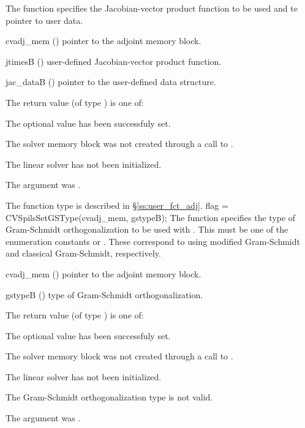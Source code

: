 {
  The function  specifies the Jacobian-vector 
  product function to be used and te pointer to user data.
}
{
  \begin{args}
  \item[cvadj\_mem] ()
    pointer to the adjoint memory block.
  \item[jtimesB] ()
    user-defined Jacobian-vector product function.
  \item[jac\_dataB] ()
    pointer to the user-defined data structure.
  \end{args}
}
{
  The return value  (of type ) is one of:
  \begin{args}
  \item[\Id{CVSPILS\_SUCCESS}] 
    The optional value has been successfuly set.
  \item[\Id{CVSPILS\_MEM\_NULL}]
    The {\cvodes} solver memory block was not created through a call to .
  \item[\Id{CVSPILS\_LMEM\_NULL}]
    The {\cvspgmr} linear solver has not been initialized.
  \item[\Id{CVSPILS\_ADJMEM\_NULL}]
    The  argument was .
  \end{args}
}
{
  The function type  is described in \S\ref{ss:user_fct_adj}.
}
{
  flag = CVSpilsSetGSType(cvadj\_mem, gstypeB);
}
{
  The function  specifies the type of
  Gram-Schmidt orthogonalization to be used with {\cvspgmr}.
  This must be one of the enumeration constants 
  or . These correspond to using modified Gram-Schmidt 
  and classical Gram-Schmidt, respectively. 
}
{
  \begin{args}
  \item[cvadj\_mem] ()
    pointer to the adjoint memory block.
  \item[gstypeB] ()
    type of Gram-Schmidt orthogonalization.
  \end{args}
}
{
  The return value  (of type ) is one of:
  \begin{args}
  \item[\Id{CVSPILS\_SUCCESS}] 
    The optional value has been successfuly set.
  \item[\Id{CVSPILS\_MEM\_NULL}]
    The {\cvodes} solver memory block was not created through a call to .
  \item[\Id{CVSPILS\_LMEM\_NULL}]
    The {\cvspgmr} linear solver has not been initialized.
  \item[\Id{CVSPILS\_ILL\_INPUT}]
    The Gram-Schmidt orthogonalization type  is not valid.
  \item[\Id{CVSPILS\_ADJMEM\_NULL}]
    The  argument was .
  \end{args}
}
